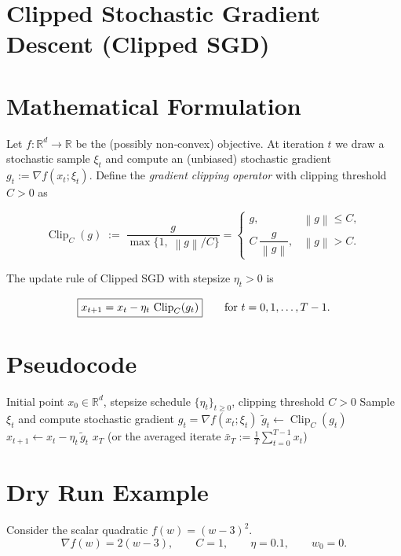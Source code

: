 \documentclass[11pt]{article}
\newcommand{\norm}[1]{\left\lVert#1\right\rVert}
\begin{document}
\section*{Clipped Stochastic Gradient Descent (Clipped SGD)}

\section*{Mathematical Formulation}
Let $f:\mathbb{R}^d\rightarrow\mathbb{R}$ be the (possibly non‑convex) objective.  
At iteration $t$ we draw a stochastic sample $\xi_t$ and compute an (unbiased) stochastic gradient $g_t:=\nabla f(x_t;\xi_t)$.  
Define the \emph{gradient clipping operator} with clipping threshold $C>0$ as  

\[
\operatorname{Clip}_C(g)\;:=\;\frac{g}{\max\!\big\{1,\;\norm{g}/C\big\}}=
\begin{cases}
g, & \norm{g}\le C,\\[4pt]
C\,\dfrac{g}{\norm{g}}, & \norm{g}>C.
\end{cases}
\]

The update rule of Clipped SGD with stepsize $\eta_t>0$ is  

\[
\boxed{%
x_{t+1}=x_t-\eta_t\,\operatorname{Clip}_C(g_t)
}
\qquad\text{for }t=0,1,\dots,T-1 .
\]

\section*{Pseudocode}
\begin{algorithm}[H]
\caption{Clipped Stochastic Gradient Descent}
\begin{algorithmic}[1]
\Require Initial point $x_0\in\mathbb{R}^d$, stepsize schedule $\{\eta_t\}_{t\ge 0}$, clipping threshold $C>0$
    \State Sample $\xi_t$ and compute stochastic gradient $g_t=\nabla f(x_t;\xi_t)$
    \State $\displaystyle \tilde g_t\gets \operatorname{Clip}_C(g_t)$ 
    \State $x_{t+1}\gets x_t-\eta_t\,\tilde g_t$ 
\EndFor
\State \Return $x_T$ (or the averaged iterate $\bar x_T:=\tfrac1T\sum_{t=0}^{T-1}x_t$)
\end{algorithmic}
\end{algorithm}

\section*{Dry Run Example}
Consider the scalar quadratic $f(w)=(w-3)^2$.
\[
\nabla f(w)=2(w-3),\qquad 
C=1,\qquad \eta=0.1,\qquad w_0=0 .
\]
\end{document}
